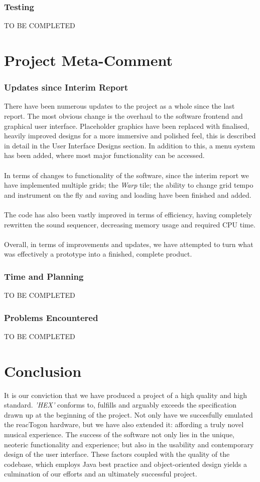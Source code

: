 \documentclass[10pt,a4paper]{article}
\begin{document}
\section{Testing}
TO BE COMPLETED

\part{Project Meta-Comment}
\section{Updates since Interim Report}
There have been numerous updates to the project as a whole since the last report. The most obvious change is the overhaul to the software frontend and graphical user interface. Placeholder graphics have been replaced with finalised, heavily improved designs for a more immersive and polished feel, this is described in detail in the User Interface Designs section. In addition to this, a menu system has been added, where most major functionality can be accessed. \\
\\
In terms of changes to functionality of the software, since the interim report we have implemented multiple grids; the \textit{Warp} tile; the ability to change grid tempo and instrument on the fly and saving and loading have been finished and added.\\
\\
The code has also been vastly improved in terms of efficiency, having completely rewritten the sound sequencer, decreasing memory usage and required CPU time.\\
\\
Overall, in terms of improvements and updates, we have attempted to turn what was effectively a prototype into a finished, complete product.\\
\section{Time and Planning}
TO BE COMPLETED
\section{Problems Encountered}
TO BE COMPLETED

\part{Conclusion}
It is our conviction that we have produced a project of a high quality and high standard. \textit{'HEX'} conforms to, fulfills and arguably exceeds the specification drawn up at the beginning of the project. Not only have we succesfully emulated the reacTogon hardware, but we have also extended it: affording a truly novel musical experience. The success of the software not only lies in the unique, neoteric functionality and experience; but also in the usability and contemporary design of the user interface. These factors coupled with the quality of the codebase, which employs Java best practice and object-oriented design yields a culmination of our efforts and an ultimately successful project.
\end{document}
